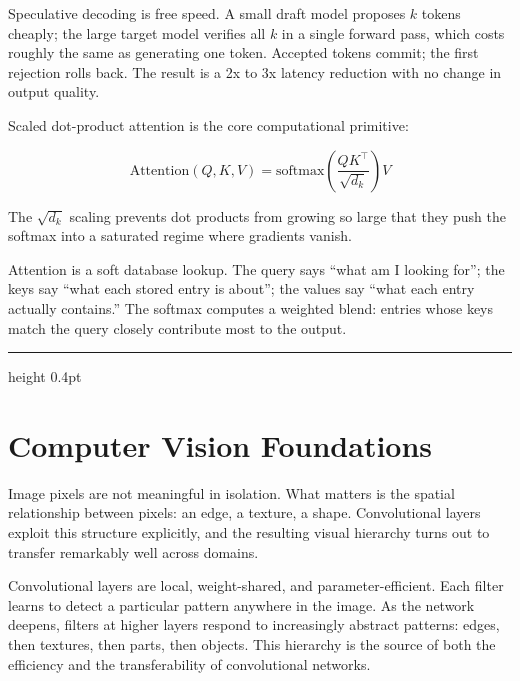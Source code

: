 \documentclass[12pt,a4paper]{article}
\begin{document}
\begin{analogy}
Speculative decoding is free speed. A small draft model proposes $k$ tokens
cheaply; the large target model verifies all $k$ in a single forward pass,
which costs roughly the same as generating one token. Accepted tokens
commit; the first rejection rolls back. The result is a 2x to 3x latency
reduction with no change in output quality.
\end{analogy}

Scaled dot-product attention is the core computational primitive:

\begin{equation*}
  \mathrm{Attention}(Q,K,V)
  = \mathrm{softmax}\!\left(\frac{QK^\top}{\sqrt{d_k}}\right)V
\end{equation*}

The $\sqrt{d_k}$ scaling prevents dot products from growing so large that
they push the softmax into a saturated regime where gradients vanish.

\begin{mentalmodel}
Attention is a soft database lookup. The query says ``what am I looking
for''; the keys say ``what each stored entry is about''; the values say
``what each entry actually contains.'' The softmax computes a weighted
blend: entries whose keys match the query closely contribute most to the
output.
\end{mentalmodel}

\vspace{10pt}\hrule height 0.4pt\vspace{14pt}

\section*{Computer Vision Foundations}

Image pixels are not meaningful in isolation. What matters is the spatial
relationship between pixels: an edge, a texture, a shape. Convolutional
layers exploit this structure explicitly, and the resulting visual
hierarchy turns out to transfer remarkably well across domains.

\begin{concept}
Convolutional layers are local, weight-shared, and parameter-efficient.
Each filter learns to detect a particular pattern anywhere in the image.
As the network deepens, filters at higher layers respond to increasingly
abstract patterns: edges, then textures, then parts, then objects.
This hierarchy is the source of both the efficiency and the transferability
of convolutional networks.
\end{concept}
\end{document}
